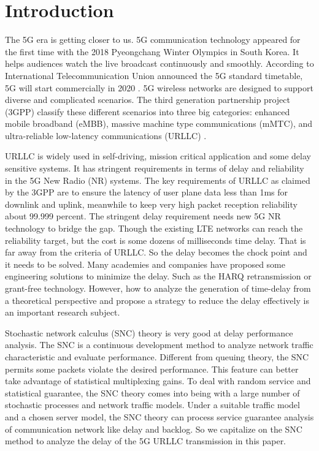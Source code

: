 \documentclass[runningheads]{llncs}
\begin{document}
\section{Introduction}
The 5G era is getting closer to us.
5G communication technology appeared for the first time with the 2018 Pyeongchang Winter Olympics in South Korea.
It helps audiences watch the live broadcast continuously and smoothly.
According to International Telecommunication Union announced the 5G standard timetable, 5G will start commercially in 2020 \cite{ref_standard1}.
5G wireless networks are designed to support diverse and complicated scenarios.
The third generation partnership project (3GPP) classify these different scenarios into three big categories: enhanced mobile broadband (eMBB), massive machine type communications (mMTC), and ultra-reliable low-latency communications (URLLC) \cite{ref_standard2}.

URLLC is widely used in self-driving, mission critical application and some delay sensitive systems.
It has stringent requirements in terms of delay and reliability in the 5G New Radio (NR) systems.
The key requirements of URLLC as claimed by the 3GPP are to ensure the latency of user plane data less than 1ms for downlink and uplink, meanwhile to keep very high packet reception reliability about 99.999 percent.\cite{ref_article1}
The stringent delay requirement needs new 5G NR technology to bridge the gap.
Though the existing LTE networks can reach the reliability target, but the cost is some dozens of milliseconds time delay.
That is far away from the criteria of URLLC.
So the delay becomes the chock point and it needs to be solved.
Many academies and companies have proposed some engineering solutions to minimize the delay.
Such as the HARQ retransmission or grant-free technology.
However, how to analyze the generation of time-delay from a theoretical perspective and propose a strategy to reduce the delay effectively is an important research subject.

Stochastic network calculus (SNC) theory is very good at delay performance analysis.
The SNC is a continuous development method to analyze network traffic characteristic and evaluate performance\cite{ref_book1}.
Different from queuing theory, the SNC permits some packets violate the desired performance.
This feature can better take advantage of statistical multiplexing gains\cite{ref_article2}.
To deal with random service and statistical guarantee, the SNC theory comes into being with a large number of stochastic processes and network traffic models.
Under a suitable traffic model and a chosen server model, the SNC theory can process service guarantee analysis of communication network like delay and backlog.
So we capitalize on the SNC method to analyze the delay of the 5G URLLC transmission in this paper.
\end{document}
